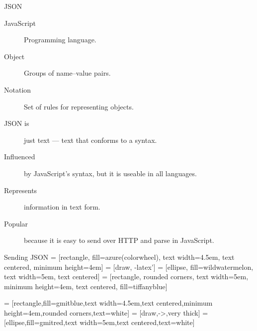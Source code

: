 \begin{frame}{JSON}
  \begin{description}
    \item[JavaScript] Programming language.
    \item[Object] Groups of name--value pairs.
    \item[Notation] Set of rules for representing objects.\\[1cm]
    \item[JSON is] just text --- text that conforms to a syntax.
    \item[Influenced] by JavaScript's syntax, but it is useable in all languages.
    \item[Represents] information in text form.
    \item[Popular] because it is easy to send over HTTP and parse in JavaScript.
  \end{description}
\end{frame}

\begin{frame}{Sending JSON}
   = [rectangle, fill=azure(colorwheel), text width=4.5em, text centered, minimum height=4em]
   = [draw, -latex']
   = [ellipse, fill=wildwatermelon, text width=5em, text centered]
   = [rectangle, rounded corners, text width=5em, minimum height=4em, text centered, fill=tiffanyblue]
  
  \begin{adjustbox}{max totalsize={.9\textwidth}{.6\textheight},center}
  
   = [rectangle,fill=gmitblue,text width=4.5em,text centered,minimum height=4em,rounded corners,text=white]
   = [draw,->,very thick]
   = [ellipse,fill=gmitred,text width=5em,text centered,text=white]
    
  \end{adjustbox}
\end{frame}

